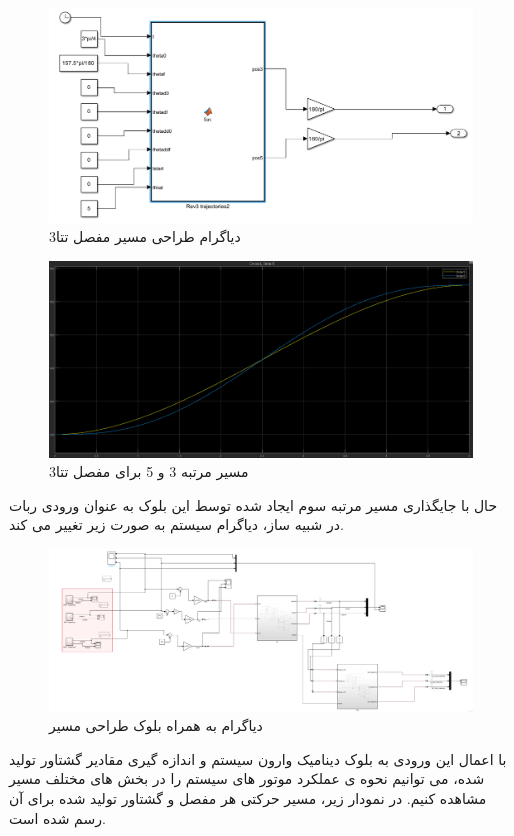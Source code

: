 \begin{figure}[H]
	\centering
	\includegraphics[width=0.7\linewidth]{../img/15}
	\caption{دیاگرام طراحی مسیر مفصل تتا3}
	\label{fig:15}
\end{figure}
\begin{figure}[H]
	\centering
	\includegraphics[width=1\linewidth]{../img/18}
	\caption{مسیر مرتبه 3 و 5 برای مفصل تتا3}
	\label{fig:18}
\end{figure}
حال با جایگذاری مسیر مرتبه سوم ایجاد شده توسط این بلوک به عنوان ورودی ربات در شبیه ساز، دیاگرام سیستم به صورت زیر تغییر می کند. 
\begin{figure}[H]
	\centering
	\includegraphics[width=1\linewidth]{../img/19}
	\caption{دیاگرام به همراه بلوک طراحی مسیر}
	\label{fig:19}
\end{figure}
با اعمال این ورودی به بلوک دینامیک وارون سیستم و اندازه گیری مقادیر گشتاور تولید شده، می توانیم نحوه ی عملکرد موتور های سیستم را در بخش های مختلف مسیر مشاهده کنیم.
در نمودار زیر، مسیر حرکتی هر مفصل و گشتاور تولید شده برای آن رسم شده است.

